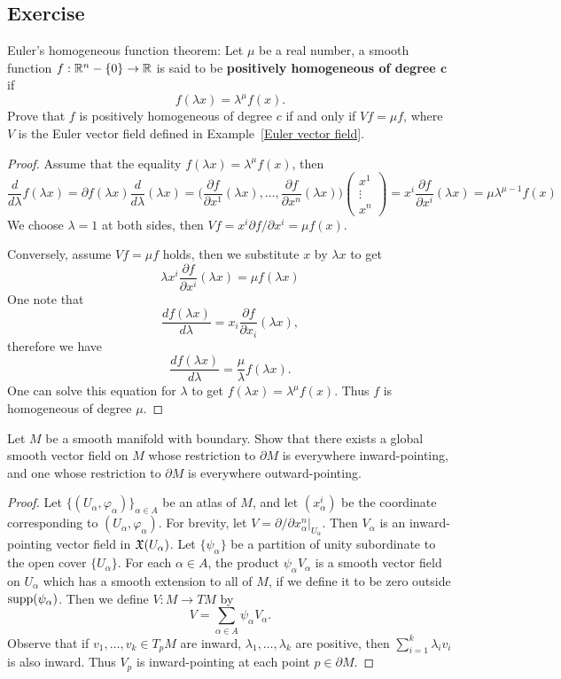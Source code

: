 \subsection{Exercise}
\begin{exercise}
Euler's homogeneous function theorem: Let $\mu$ be a real number, a smooth function $f:\mathbb{R}^n-\{0\}\to\mathbb{R}$ is said to be \textbf{positively homogeneous of degree $\bm{c}$} if
\[f(\lambda x)=\lambda^\mu f(x).\] 
Prove that $f$ is positively homogeneous of degree $c$ if and only if $Vf=\mu f$, where $V$ is the Euler vector field defined in Example~\ref{Euler vector field}.
\end{exercise}
\begin{proof}
Assume that the equality $f(\lambda x)=\lambda^\mu f(x)$, then 
\[\frac{d}{d\lambda}f(\lambda x)=\partial f(\lambda x)\frac{d}{d\lambda}(\lambda x)=\Big(\frac{\partial f}{\partial x^1}(\lambda x),\dots,\frac{\partial f}{\partial x^n}(\lambda x)\Big)\begin{pmatrix}
x^1\\
\vdots\\
x^n
\end{pmatrix}=x^i\frac{\partial f}{\partial x^i}(\lambda x)=\mu\lambda^{\mu-1}f(x)\]
We choose $\lambda=1$ at both sides, then $Vf=x^i\partial f/\partial x^i=\mu f(x)$.\par
Conversely, assume $Vf=\mu f$ holds, then we substitute $x$ by $\lambda x$ to get
\[\lambda x^i\frac{\partial f}{\partial x^i}(\lambda x)=\mu f(\lambda x)\]
One note that 
\[\frac{d f(\lambda x)}{d\lambda}=x_i\frac{\partial f}{\partial x_i}(\lambda x),\]
therefore we have
\[\frac{d f(\lambda x)}{d\lambda}=\frac{\mu}{\lambda}f(\lambda x).\]
One can solve this equation for $\lambda$ to get $f(\lambda x)=\lambda^\mu f(x)$. Thus $f$ is homogeneous of degree $\mu$.
\end{proof}
\begin{exercise}\label{vector field inward}
Let $M$ be a smooth manifold with boundary. Show that there exists a global smooth vector field on $M$ whose restriction to $\partial M$ is everywhere inward-pointing, and one whose restriction to $\partial M$ is everywhere outward-pointing.
\end{exercise}
\begin{proof}
Let $\{(U_\alpha,\varphi_\alpha)\}_{\alpha\in A}$ be an atlas of $M$, and let $(x^i_\alpha)$ be the coordinate corresponding to $(U_\alpha,\varphi_\alpha)$. For brevity, let $V=\partial/\partial x_\alpha^n|_{U_\alpha}$. Then $V_\alpha$ is an inward-pointing vector field in $\mathfrak{X}(U_\alpha)$. Let $\{\psi_\alpha\}$ be a partition of unity subordinate to the open cover $\{U_\alpha\}$. For each $\alpha\in A$, the product $\psi_\alpha V_\alpha$ is a smooth vector field on $U_\alpha$ which has a smooth extension to all of $M$, if we define it to be zero outside $\mathrm{supp}(\psi_\alpha)$. Then we define $V:M\to TM$ by
\[V=\sum_{\alpha\in A}\psi_\alpha V_\alpha.\]
Observe that if $v_1,\dots,v_k\in T_pM$ are inward, $\lambda_1,\dots,\lambda_k$ are positive, then $\sum_{i=1}^{k}\lambda_iv_i$ is also inward. Thus $V_p$ is inward-pointing at each point $p\in\partial M$.
\end{proof}
